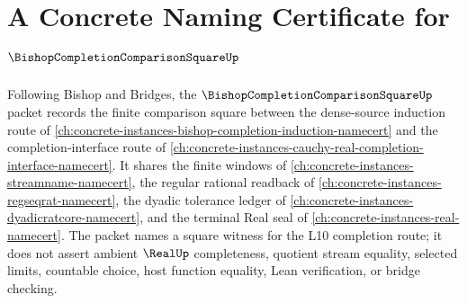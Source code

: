 \chapter{A Concrete Naming Certificate for $\BishopCompletionComparisonSquareUp$}
\label{ch:concrete-instances-bishop-completion-comparison-square-namecert}

Following Bishop and Bridges, the $\BishopCompletionComparisonSquareUp$ packet records the finite comparison square between the dense-source induction route of \autoref{ch:concrete-instances-bishop-completion-induction-namecert} and the completion-interface route of \autoref{ch:concrete-instances-cauchy-real-completion-interface-namecert}. It shares the finite windows of \autoref{ch:concrete-instances-streamname-namecert}, the regular rational readback of \autoref{ch:concrete-instances-regseqrat-namecert}, the dyadic tolerance ledger of \autoref{ch:concrete-instances-dyadicratcore-namecert}, and the terminal Real seal of \autoref{ch:concrete-instances-real-namecert}. The packet names a square witness for the L10 completion route; it does not assert ambient $\RealUp$ completeness, quotient stream equality, selected limits, countable choice, host function equality, Lean verification, or bridge checking.

